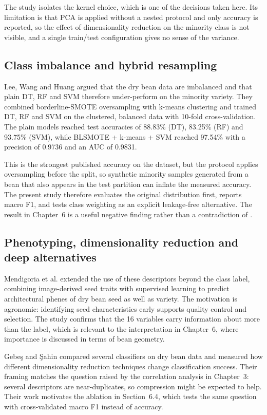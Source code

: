 The study isolates the kernel choice, which is one of the decisions taken here. Its
limitation is that PCA is applied without a nested protocol and only accuracy is
reported, so the effect of dimensionality reduction on the minority class is not
visible, and a single train/test configuration gives no sense of the variance.

\subsection{Class imbalance and hybrid resampling}

Lee, Wang and Huang \cite{lee2024} argued that the dry bean data are imbalanced and
that plain DT, RF and SVM therefore under-perform on the minority variety. They
combined borderline-SMOTE oversampling with k-means clustering and trained DT, RF
and SVM on the clustered, balanced data with 10-fold cross-validation. The plain
models reached test accuracies of 88.83\% (DT), 83.25\% (RF) and 93.75\% (SVM),
while BLSMOTE + k-means + SVM reached 97.54\% with a precision of 0.9736 and an AUC
of 0.9831.

This is the strongest published accuracy on the dataset, but the protocol applies
oversampling before the split, so synthetic minority samples generated from a bean
that also appears in the test partition can inflate the measured accuracy. The
present study therefore evaluates the original distribution first, reports macro
F1, and tests class weighting as an explicit leakage-free alternative. The result
in Chapter~6 is a useful negative finding rather than a contradiction of
\cite{lee2024}.

\subsection{Phenotyping, dimensionality reduction and deep alternatives}

Mendigoria et al. \cite{mendigoria2021} extended the use of these descriptors
beyond the class label, combining image-derived seed traits with supervised
learning to predict architectural phenes of dry bean seed as well as variety. The
motivation is agronomic: identifying seed characteristics early supports quality
control and selection. The study confirms that the 16 variables carry information
about more than the label, which is relevant to the interpretation in Chapter~6,
where importance is discussed in terms of bean geometry.

Gebeş and Şahin \cite{gebes2025} compared several classifiers on dry bean data and
measured how different dimensionality reduction techniques change classification
success. Their framing matches the question raised by the correlation analysis in
Chapter~3: several descriptors are near-duplicates, so compression might be
expected to help. Their work motivates the ablation in Section~6.4, which tests the
same question with cross-validated macro F1 instead of accuracy.

